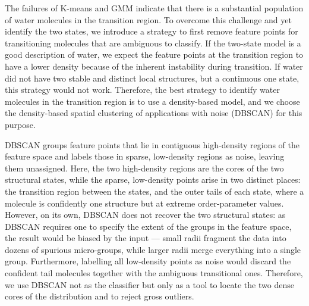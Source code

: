 \documentclass[aps, amsmath,amssymb, reprint, twocolumn, superscriptaddress]{revtex4-2}
\begin{document}
The failures of K-means and GMM indicate that there is a substantial population of water molecules in the transition region. To overcome this challenge and yet identify the two states, we introduce a strategy to first remove feature points for transitioning molecules that are ambiguous to classify. If the two-state model is a good description of water, we expect the feature points at the transition region to have a lower density because of the inherent instability during transition. If water did not have two stable and distinct local structures, but a continuous one state, this strategy would not work. Therefore, the best strategy to identify water molecules in the transition region is to use a density-based model, and we choose the density-based spatial clustering of applications with noise (DBSCAN) for this purpose. \cite{ester_density-based_1996}

DBSCAN groups feature points that lie in contiguous high-density regions of the feature space and labels those in sparse, low-density regions as noise, leaving them unassigned\cite{ester_density-based_1996}. Here, the two high-density regions are the cores of the two structural states, while the sparse, low-density points arise in two distinct places: the transition region between the states, and the outer tails of each state, where a molecule is confidently one structure but at extreme order-parameter values. However, on its own, DBSCAN does not recover the two structural states: as DBSCAN requires one to specify the extent of the groups in the feature space, the result would be biased by the input --- small radii fragment the data into dozens of spurious micro-groups, while larger radii merge everything into a single group. Furthermore, labelling all low-density points as noise would discard the confident tail molecules together with the ambiguous transitional ones. Therefore, we use DBSCAN not as the classifier but only as a tool to locate the two dense cores of the distribution and to reject gross outliers. 
\end{document}
